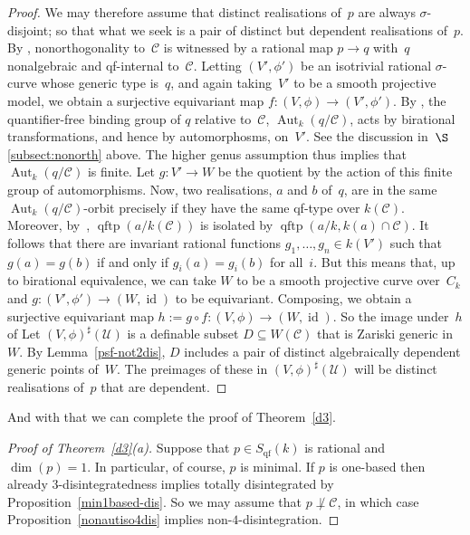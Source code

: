 \documentclass[\DocOpts]{amsart}
\theoremstyle{definition}
\def\qftp{\operatorname{qftp}}
\def\qf{\operatorname{qf}}
\def\aut{\operatorname{Aut}}
\def\C{\mathcal{C}}
\def\U{\mathcal{U}}
\providecommand{\id}{\operatorname{id}}
\newcommand{\<}{\langle}
\renewcommand{\>}{\rangle}
\begin{document}
\begin{proof}
We may therefore assume that distinct realisations of~$p$ are always $\sigma$-disjoint; so that what we seek is a pair of distinct but dependent realisations of~$p$.
By \cite[Proposition~2.12]{qfint}, nonorthogonality to~$\C$ is witnessed by a rational map $p\to q$ with~$q$ nonalgebraic and qf-internal to~$\C$.
Letting $(V',\phi')$ be an isotrivial rational $\sigma$-curve whose generic type is~$q$, and again taking~$V'$ to be a smooth projective model, we obtain a surjective equivariant map
$f:(V,\phi)\to(V',\phi')$.
By \cite[Theorem~1.6]{qfint}, the quantifier-free binding group of $q$ relative to~$\C$, $\aut_k(q/\C)$, acts by birational transformations, and hence by automorphosms, on~$V'$.
See the discussion in~$\S$\ref{subsect:nonorth} above.
The higher genus assumption thus implies that $\aut_k(q/\C)$ is finite.
Let $g:V'\to W$ be the quotient by the action of this finite group of automorphisms.
Now, two realisations, $a$ and $b$ of~$q$, are in the same $\aut_k(q/\C)$-orbit precisely if they have the same qf-type over \(k(\C)\).
Moreover, by~\cite[Proposition~2.5]{qfint}, $\qftp(a/k(\C))$ is isolated by $\qftp(a/k, k(a)\cap\C)$.
It follows that there are  invariant rational functions $g_1,\dots,g_n\in k(V')$ such that $g(a)=g(b)$ if and only if $g_i(a)=g_i(b)$ for all~$i$.
But this means that, up to birational equivalence, we can take $W$ to be a smooth projective curve over~$C_k$ and $g:(V',\phi')\to (W,\id)$ to be equivariant.
Composing, we obtain a surjective equivariant map $h:=g\circ f:(V,\phi)\to(W,\id)$.
So the image under~$h$ of Let \((V,\phi)^\sharp(\U)\) is a definable subset \(D\subseteq{}W(\C)\) that is Zariski generic in~$W$.
By Lemma~\ref{psf-not2dis}, $D$ includes a pair of 
		distinct algebraically dependent generic points of~$W$.
		The preimages of these in \((V,\phi)^\sharp(\U)\) will be distinct realisations of~$p$ that are dependent.
\end{proof}

And with that we can complete the proof of Theorem~\ref{d3}.

\begin{proof}[Proof of Theorem~\ref{d3}(a)]
Suppose that $p\in S_{\qf}(k)$ is rational and $\dim(p)=1$.
In particular, of course, $p$ is minimal.
If $p$ is one-based then already $3$-disintegratedness implies totally disintegrated by Proposition~\ref{min1based-dis}.
So we may assume that \(p\not\perp\C\), in which case Proposition~\ref{nonautiso4dis} implies non-$4$-disintegration.
\end{proof}
\end{document}
